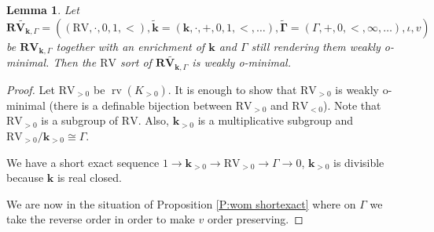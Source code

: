 \documentclass[11pt]{amsart}
\DeclareMathOperator{\rv}{rv}
\newtheorem{corollary}[theorem]{Corollary}
\newtheorem{lemma}[theorem]{Lemma}
\theoremstyle{definition}
\newcommand{\bk}{\textbf{k}}
\newcommand{\0}{\emptyset}
\begin{document}
        
    \begin{lemma}\label{L:wom shortexact of RV}
        Let $\widetilde{\mathbf{RV}_{\bk,\Gamma}}=((\mathrm{RV},\cdot, 0,1,<),\widetilde{\bk}=(\bk,\cdot,+,0,1,<,\dots),\widetilde{\mathbf{\Gamma}}=(\Gamma,+,0,<,\infty,\dots),\iota,v)$ be $\mathbf{RV}_{\bk,\Gamma}$ together with an enrichment of $\bk$ and $\Gamma$ still rendering them weakly o-minimal. Then the $\mathrm{RV}$ sort of $\widetilde{\mathbf{RV}_{\bk,\Gamma}}$ is  weakly o-minimal.
    \end{lemma}
    \begin{proof}
       Let $\mathrm{RV}_{>0}$ be $\rv(K_{>0})$. It is enough to show that $\mathrm{RV}_{>0}$ is weakly o-minimal (there is a definable bijection between $\mathrm{RV}_{>0}$ and $\mathrm{RV}_{<0}$).      Note that $\mathrm{RV}_{>0}$ is a subgroup of $\mathrm{RV}$. Also, $\bk_{>0}$ is a multiplicative subgroup and $\mathrm{RV}_{>0}/\bk_{>0}\cong \Gamma$.

        
         We have a short exact sequence $1\to \bk_{>0}\to \mathrm{RV}_{>0}\to \Gamma\to 0$, $\bk_{>0}$ is divisible because $\bk$ is real closed. 
         
        We are now in the situation of Proposition \ref{P:wom shortexact} where on $\Gamma$ we take the reverse order in order to make $v$ order preserving.
        \end{proof}

    
    

    
\end{document}
